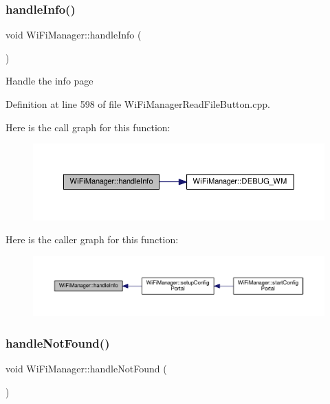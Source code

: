 \subsubsection{\texorpdfstring{handle\+Info()}{handleInfo()}}
{\footnotesize\ttfamily void Wi\+Fi\+Manager\+::handle\+Info (\begin{DoxyParamCaption}{ }\end{DoxyParamCaption})\hspace{0.3cm}{\ttfamily [private]}}

Handle the info page 

Definition at line 598 of file Wi\+Fi\+Manager\+Read\+File\+Button.\+cpp.

Here is the call graph for this function\+:\nopagebreak
\begin{figure}[H]
\begin{center}
\leavevmode
\includegraphics[width=350pt]{class_wi_fi_manager_ac35e46661f8a209d84bba62d9aa43a35_cgraph}
\end{center}
\end{figure}
Here is the caller graph for this function\+:\nopagebreak
\begin{figure}[H]
\begin{center}
\leavevmode
\includegraphics[width=350pt]{class_wi_fi_manager_ac35e46661f8a209d84bba62d9aa43a35_icgraph}
\end{center}
\end{figure}
\mbox{\label{class_wi_fi_manager_a7d01f7de3e4b76acdabffac79fa3d0ab}} 
\subsubsection{\texorpdfstring{handle\+Not\+Found()}{handleNotFound()}}
{\footnotesize\ttfamily void Wi\+Fi\+Manager\+::handle\+Not\+Found (\begin{DoxyParamCaption}{ }\end{DoxyParamCaption})\hspace{0.3cm}{\ttfamily [private]}}



